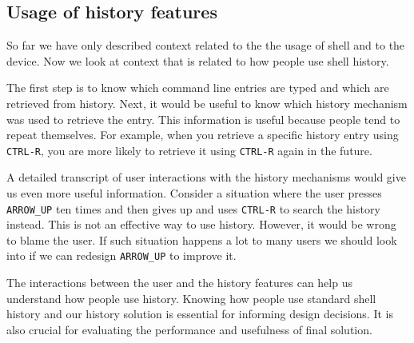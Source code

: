 \subsection{Usage of history features}

So far we have only described context related to the the usage of shell and to the device. Now we look at context that is related to how people use shell history. 

The first step is to know which command line entries are typed and which are retrieved from history. Next, it would be useful to know which history mechanism was used to retrieve the entry. This information is useful because people tend to repeat themselves. 
For example, when you retrieve a specific history entry using \verb|CTRL-R|, you are more likely to retrieve it using \verb|CTRL-R| again in the future. %


A detailed transcript of user interactions with the history mechanisms would give us even more useful information. Consider a situation where the user presses \verb|ARROW_UP| ten times and then gives up and uses \verb|CTRL-R| to search the history instead. This is not an effective way to use history. However, it would be wrong to blame the user. If such situation happens a lot to many users we should look into if we can redesign \verb|ARROW_UP| to improve it.

The interactions between the user and the history features can help us understand how people use history. Knowing how people use standard shell history and our history solution is essential for informing design decisions. It is also crucial for evaluating the performance and usefulness of final solution. %
